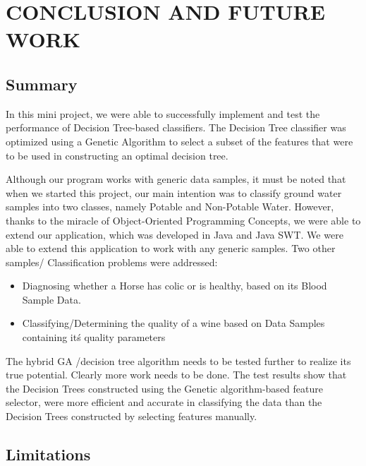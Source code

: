 \documentclass[12pt]{report}
\begin{document}
\chapter{CONCLUSION AND FUTURE WORK}

\section{Summary}
In this mini project, we were able to successfully implement and test the performance of Decision Tree-based classifiers. The Decision Tree classifier was optimized using a Genetic Algorithm to select a subset of the features that were to be used in constructing an optimal decision tree.


Although our program works with generic data samples, it must be noted that when we started this project, our main intention was to classify ground water samples into two classes, namely Potable and Non-Potable Water. However, thanks to the miracle of Object-Oriented Programming Concepts, we were able to extend our application, which was developed in Java and Java SWT. We were able to extend this application to work with any generic samples. Two other samples/ Classification problems were addressed:
\begin{itemize}
\item{Diagnosing whether a Horse has colic or is healthy, based on its Blood Sample Data.}
\item{Classifying/Determining the quality of a wine based on Data Samples containing it\'s quality parameters} 
\end{itemize} 

The hybrid GA /decision tree algorithm needs to be tested
further to realize its true potential. Clearly more work needs to be done. 
The test results show that the Decision Trees constructed using the Genetic algorithm-based feature selector, were more efficient and accurate in classifying the data than the Decision Trees constructed by selecting features manually.

\section{Limitations}
\end{document}
